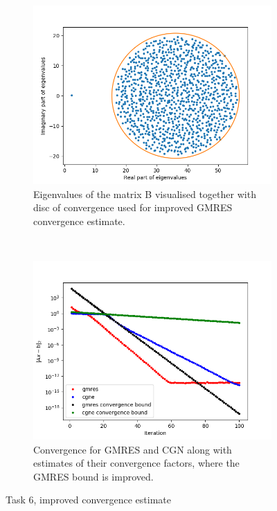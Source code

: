 \begin{figure}[h!]
	\centering
	\begin{subfigure}[t]{0.49\textwidth}
		\includegraphics[width=\textwidth]{Eigens2.png}
		\caption{Eigenvalues of the matrix B visualised together with disc of convergence used for improved GMRES convergence estimate.}
	\end{subfigure}~
	\begin{subfigure}[t]{0.49\textwidth}
		\includegraphics[width=\textwidth]{error_itr2.png}
		\caption{Convergence for GMRES and CGN along with estimates of their convergence factors, where the GMRES bound is improved.}
	\end{subfigure}
	\caption{Task 6, improved convergence estimate}
	\label{better}
\end{figure}

